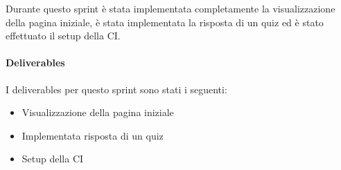 Durante questo sprint è stata implementata completamente la visualizzazione della pagina iniziale, è stata implementata la risposta di un quiz ed è stato effettuato il setup della CI.
\paragraph{Deliverables} 
I deliverables per questo sprint sono stati i seguenti:
\begin{itemize}
    \item Visualizzazione della pagina iniziale
    \item Implementata risposta di un quiz
    \item Setup della CI 
\end{itemize}
